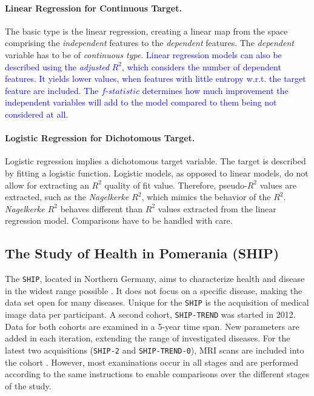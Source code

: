 \documentclass[journal]{style/vgtc} 			          %
\newcommand{\add}[1]{\textcolor{blue}{#1}}
\begin{document}
\paragraph{Linear Regression for Continuous Target.}
The basic type is the linear regression, creating a linear map from the space comprising the \emph{independent} features to the \emph{dependent} features.
The \emph{dependent} variable has to be of \emph{continuous type}.
\add{
Linear regression models can also be described using the \emph{adjusted} $R^2$, which considers the number of dependent features.
It yields lower values, when features with little entropy w.r.t. the target feature are included.
The $f$-$statistic$ determines how much improvement the independent variables will add to the model compared to them being not considered at all.
}

\paragraph{Logistic Regression for Dichotomous Target.} Logistic regression implies a dichotomous target variable.
The target is described by fitting a logistic function.
Logistic models, as opposed to linear models, do not allow for extracting an $R^2$ quality of fit value.
Therefore, pseudo-$R^2$ values are extracted, such as the \emph{Nagelkerke $R^2$}, which mimics the behavior of the $R^2$.
\emph{Nagelkerke $R^2$} behaves different than $R^2$ values extracted from the linear regression model.
Comparisons have to be handled with care.
\subsection{The Study of Health in Pomerania (SHIP)}
The \texttt{SHIP}, located in Northern Germany, aims to characterize health and disease in the widest range possible \cite{Volzke2011}.
It does not focus on a specific disease, making the data set open for many diseases.
Unique for the \texttt{SHIP} is the acquisition of medical image data per participant.
A second cohort, \texttt{SHIP-TREND} was started in 2012.
Data for both cohorts are examined in a 5-year time span.
New parameters are added in each iteration, extending the range of investigated diseases.
For the latest two acquisitions (\texttt{SHIP-2} and \texttt{SHIP-TREND-0}), MRI scans are included into the cohort \cite{Hegenscheid2009, Ivanovska2014}.
However, most examinations occur in all stages and are performed according to the same instructions to enable comparisons over the different stages of the study.
\end{document}
